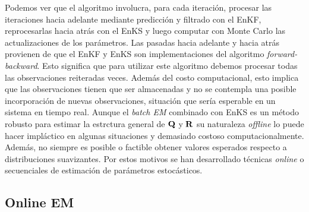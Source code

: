 Podemos ver que el algoritmo involucra, para cada iteración, procesar las iteraciones hacia adelante mediante predicción y filtrado con el EnKF, reprocesarlas hacia atrás con el EnKS y luego computar con Monte Carlo las actualizaciones de los parámetros. Las pasadas hacia adelante y hacia atrás provienen de que el EnKF y EnKS son implementaciones del algoritmo \textit{forward-backward}. Esto significa que para utilizar este algoritmo debemos procesar todas las observaciones reiteradas veces. Además del costo computacional, esto implica que las observaciones tienen que ser almacenadas y no se contempla una posible incorporación de nuevas observaciones, situación que sería esperable en un sistema en tiempo real. Aunque el \textit{batch EM} combinado con EnKS es un método robusto para estimar la estrctura general de $\mathbf{Q}$ y $\mathbf{R}$ su naturaleza \textit{offline} lo puede hacer impláctico en algunas situaciones y demasiado costoso computacionalmente. Además, no siempre es posible o factible obtener valores esperados respecto a distribuciones suavizantes. Por estos motivos se han desarrollado técnicas \textit{online} o secuenciales de estimación de parámetros estocásticos. 

\subsection{Online EM} \label{sec:onlineEM}

